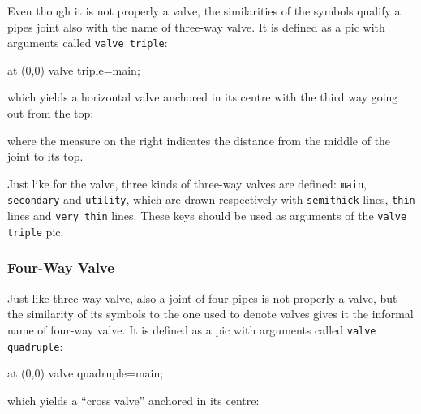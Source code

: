 \documentclass[12pt]{article}						%
\newcommand*{\chpn}[1]{\texttt{#1}}				%
\newcommand*{\chpp}[1]{\texttt{#1}}				%
\newcommand*{\chpa}[1]{\texttt{#1}}				%
\begin{document}
Even though it is not properly a valve, the similarities of the symbols qualify a
pipes joint also with the name of three-way valve. It is defined as a pic with
arguments called \chpp{valve triple}:
\begin{chpcode}
	\pic at (0,0) {valve triple=main};
\end{chpcode}
which yields a horizontal valve anchored in its centre with the third way going
out from the top:
\begin{center}
\end{center}
where the measure on the right indicates the distance from the middle of the
joint to its top.

Just like for the valve, three kinds of three-way valves are defined:
\chpa{main}, \chpa{secondary} and \chpa{utility}, which are drawn respectively
with \verb|semithick| lines, \verb|thin| lines and \verb|very thin| lines. These
keys should be used as arguments of the \chpp{valve triple} pic.

\subsubsection{Four-Way Valve}

Just like three-way valve, also a joint of four pipes is not properly a valve,
but the similarity of its symbols to the one used to denote valves gives it the
informal name of four-way valve. It is defined as a pic with arguments called
\chpp{valve quadruple}:
\begin{chpcode}
	\pic at (0,0) {valve quadruple=main};
\end{chpcode}
which yields a ``cross valve'' anchored in its centre:
\begin{center}
\end{center}
\end{document}
